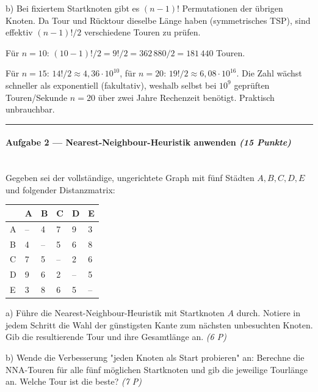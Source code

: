 \documentclass[11pt, a4paper]{article}
\begin{document}
b) Bei fixiertem Startknoten gibt es $(n-1)!$ Permutationen der übrigen Knoten. Da Tour und Rücktour dieselbe Länge haben (symmetrisches TSP), sind effektiv $(n-1)!/2$ verschiedene Touren zu prüfen.


Für $n=10$: $(10-1)!/2 = 9!/2 = 362\,880/2 = 181\,440$ Touren.


Für $n=15$: $14!/2 \approx 4{,}36 \cdot 10^{10}$, für $n=20$: $19!/2 \approx 6{,}08 \cdot 10^{16}$. Die Zahl wächst schneller als exponentiell (fakultativ), weshalb selbst bei $10^9$ geprüften Touren/Sekunde $n=20$ über zwei Jahre Rechenzeit benötigt. Praktisch unbrauchbar.



\noindent\textcolor{rulegray}{\rule{\linewidth}{0.4pt}}


\paragraph{Aufgabe 2 — Nearest-Neighbour-Heuristik anwenden \textit{(15 Punkte)}}\mbox{}\\[2pt]

Gegeben sei der vollständige, ungerichtete Graph mit fünf Städten $A,B,C,D,E$ und folgender Distanzmatrix:



{\small
\begin{tabularx}{\linewidth}{XXXXXX}
\hline
\rowcolor{tableheadbg}
{\color{white}\textbf{}} & {\color{white}\textbf{A}} & {\color{white}\textbf{B}} & {\color{white}\textbf{C}} & {\color{white}\textbf{D}} & {\color{white}\textbf{E}} \\[2pt]
\hline
\endhead
\hline
\endfoot
A & – & 4 & 7 & 9 & 3 \\
B & 4 & – & 5 & 6 & 8 \\
C & 7 & 5 & – & 2 & 6 \\
D & 9 & 6 & 2 & – & 5 \\
E & 3 & 8 & 6 & 5 & – \\
\end{tabularx}
}


a) Führe die Nearest-Neighbour-Heuristik mit Startknoten $A$ durch. Notiere in jedem Schritt die Wahl der günstigsten Kante zum nächsten unbesuchten Knoten. Gib die resultierende Tour und ihre Gesamtlänge an. \textit{(6 P)}


b) Wende die Verbesserung "jeden Knoten als Start probieren" an: Berechne die NNA-Touren für alle fünf möglichen Startknoten und gib die jeweilige Tourlänge an. Welche Tour ist die beste? \textit{(7 P)}
\end{document}
